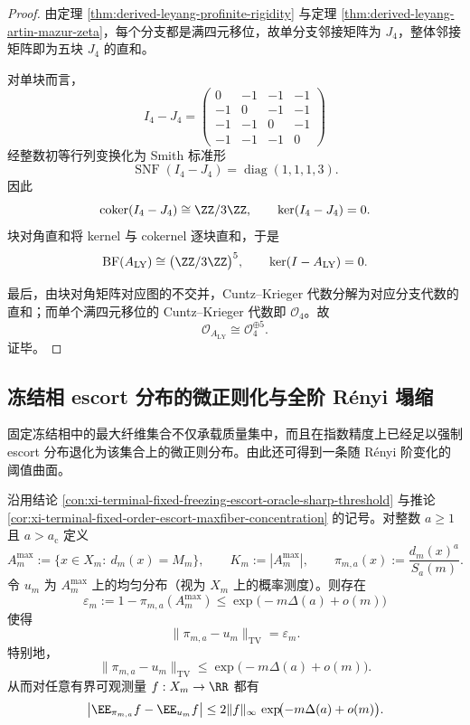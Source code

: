 \begin{proof}
由定理 \ref{thm:derived-leyang-profinite-rigidity} 与定理 \ref{thm:derived-leyang-artin-mazur-zeta}，每个分支都是满四元移位，故单分支邻接矩阵为 \(J_4\)，整体邻接矩阵即为五块 \(J_4\) 的直和。

对单块而言，
\[
I_4-J_4=
\begin{pmatrix}
0&-1&-1&-1\\
-1&0&-1&-1\\
-1&-1&0&-1\\
-1&-1&-1&0
\end{pmatrix}
\]
经整数初等行列变换化为 Smith 标准形
\[
\operatorname{SNF}(I_4-J_4)=\operatorname{diag}(1,1,1,3).
\]
因此
\[
\operatorname{coker}(I_4-J_4)\cong \ZZ/3\ZZ,
\qquad
\ker(I_4-J_4)=0.
\]
块对角直和将 kernel 与 cokernel 逐块直和，于是
\[
\mathrm{BF}(A_{\mathrm{LY}})
\cong
\bigl(\ZZ/3\ZZ\bigr)^5,
\qquad
\ker(I-A_{\mathrm{LY}})=0.
\]

最后，由块对角矩阵对应图的不交并，Cuntz--Krieger 代数分解为对应分支代数的直和；而单个满四元移位的 Cuntz--Krieger 代数即 \(\mathcal O_4\)。故
\[
\mathcal O_{A_{\mathrm{LY}}}\cong \mathcal O_4^{\oplus 5}.
\]
证毕。
\end{proof}

\subsection{冻结相 escort 分布的微正则化与全阶 Rényi 塌缩}

固定冻结相中的最大纤维集合不仅承载质量集中，而且在指数精度上已经足以强制 escort 分布退化为该集合上的微正则分布。由此还可得到一条随 Rényi 阶变化的阈值曲面。

\begin{theorem}\label{thm:derived-fixed-freezing-microcanonical-tv}
沿用结论 \ref{con:xi-terminal-fixed-freezing-escort-oracle-sharp-threshold} 与推论 \ref{cor:xi-terminal-fixed-order-escort-maxfiber-concentration} 的记号。对整数 \(a\ge 1\) 且 \(a>a_{\mathrm c}\) 定义
\[
A_m^{\max}:=\{x\in X_m:\ d_m(x)=M_m\},
\qquad
K_m:=|A_m^{\max}|,
\qquad
\pi_{m,a}(x):=\frac{d_m(x)^a}{S_a(m)}.
\]
令 \(u_m\) 为 \(A_m^{\max}\) 上的均匀分布（视为 \(X_m\) 上的概率测度）。则存在
\[
\varepsilon_m:=1-\pi_{m,a}(A_m^{\max})
\le
\exp\!\bigl(-m\Delta(a)+o(m)\bigr)
\]
使得
\[
\|\pi_{m,a}-u_m\|_{\mathrm{TV}}=\varepsilon_m.
\]
特别地，
\[
\|\pi_{m,a}-u_m\|_{\mathrm{TV}}
\le
\exp\!\bigl(-m\Delta(a)+o(m)\bigr).
\]
从而对任意有界可观测量 \(f:X_m\to\RR\) 都有
\[
\bigl|\EE_{\pi_{m,a}}f-\EE_{u_m}f\bigr|
\le
2\|f\|_{\infty}\,
\exp\!\bigl(-m\Delta(a)+o(m)\bigr).
\]
\end{theorem}

